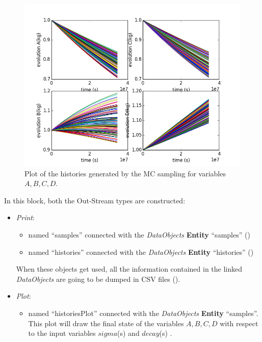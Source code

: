 \begin{enumerate}
 \begin{figure}[h!]
  \centering
  \includegraphics[scale=0.7]{pics/MC_histories.png}
  \caption{Plot of the histories generated by the MC sampling for variables $A,B,C,D$.}
  \label{fig:historiesMCPlotLine}
 \end{figure}
  In this block, both the Out-Stream types are constructed: 
  \begin{itemize}
    \item \textit{Print}: 
     \begin{itemize}
       \item named ``samples'' connected with the \textit{DataObjects} \textbf{Entity} ``samples'' 
                ()
       \item named ``histories'' connected with the \textit{DataObjects} \textbf{Entity} ``histories'' ()          
     \end{itemize}         
      When these objects get used, all the information contained in the 
      linked  \textit{DataObjects} are going 
    to be dumped in CSV files ().
    \item \textit{Plot}: 
    \begin{itemize}
      \item named ``historiesPlot'' connected with the  \textit{DataObjects} 
      \textbf{Entity} ``samples''.  This plot will draw the final state of the
      variables $A,B,C,D$ with respect to the input variables $sigma$(s) 
      and $decay$(s) . 

\end{itemize}
\end{itemize}
\end{enumerate}
